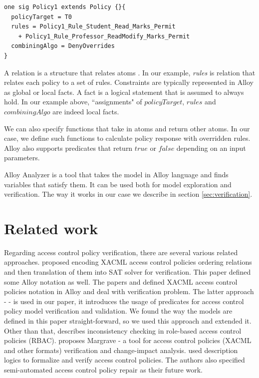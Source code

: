 \documentclass{acm_proc_article-sp}
\begin{document}
\begin{verbatim}
one sig Policy1 extends Policy {}{
  policyTarget = T0
  rules = Policy1_Rule_Student_Read_Marks_Permit 
    + Policy1_Rule_Professor_ReadModify_Marks_Permit
  combiningAlgo = DenyOverrides
}
\end{verbatim}

A relation is a structure that relates atoms \cite{jackson:alloy}. In our example, \textit{rules} is relation that relates each policy to a set of rules. Constraints are typically represented in Alloy as global or local facts. A fact is a logical statement that is assumed to always hold. In our example above, ``assignments" of $policyTarget$, $rules$ and $combiningAlgo$ are indeed local facts.

We can also specify functions that take in atoms and return other atoms. In our case, we define such functions to calculate policy response with overridden rules. Alloy also supports predicates that return $true$ or $false$ depending on an input parameters.

Alloy Analyzer is a tool that takes the model in Alloy language and finds variables that satisfy them. It can be used both for model exploration and verification. The way it works in our case we describe in section \ref{sec:verification}.

\section{Related work}

Regarding access control policy verification, there are several various related approaches.
\cite{Hughes:2008:AVA:1459278.1459282} proposed encoding XACML access control policies  ordering relations and then translation of them into SAT solver for verification. This paper defined some Alloy notation as well.  The papers \cite{acp:automated} and \cite{acp:alloy} defined XACML access control policies notation in Alloy and deal with verification problem. The latter approach - \cite{acp:alloy} - is used in our paper, it introduces the usage of predicates for access control policy model verification and validation. We found the way the models are defined in this paper straight-forward, so we used this approach and extended it. Other than that, \cite{4258517} describes inconsistency checking in role-based access control policies (RBAC). \cite{Fisler:2005:VCA:1062455.1062502} proposes Margrave - a tool for access control policies (XACML and other formats) verification and change-impact analysis. \cite {acp:descriptionlogics} used description logics to formalize and verify access control policies. The authors also specified semi-automated access control policy repair as their future work.
\end{document}
